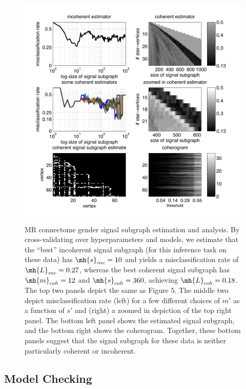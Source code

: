 \documentclass[10pt,journal,cspaper,compsoc]{IEEEtran}
\begin{document}


\begin{figure}[htbp]
	\centering
		\includegraphics[width=1.0\linewidth]{../figs/BLSA0317_Count_Lhats_results.pdf}
	\caption{MR connectome gender signal subgraph estimation and analysis. By cross-validating over hyperparameters and models, we estimate that the ``best'' incoherent signal subgraph (for this inference task on these data) has $\mh{s}_{inc}=10$ and yields a misclassification rate of $\mh{L}_{inc}=0.27$, whereas the best coherent signal subgraph has $\mh{m}_{coh}=12$ and $\mh{s}_{coh}=360$, achieving $\mh{L}_{coh}=0.18$.  The top two panels depict the same as Figure 5.  The middle two depict misclassification rate (left) for a few different choices of $m'$ as a function of $s'$ and (right) a zoomed in depiction of the top right panel. The bottom left panel shows the estimated signal subgraph, and the bottom right shows the coherogram.  Together, these bottom panels suggest that the signal subgraph for these data is neither particularly coherent or incoherent.}
	\label{fig:data}
\end{figure}

\subsection{Model Checking} %
\label{sub:model_checking}
\end{document}
